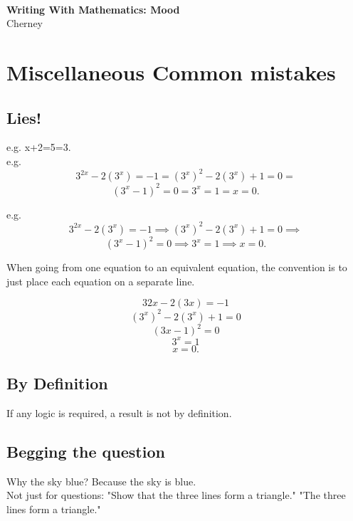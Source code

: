 \documentclass[12pt]{article}
\def\noi{\noindent}
\begin{document}
\thispagestyle{empty}
~
\vspace{-3.9cm}
\begin{center}
{
\Large
 {\bfseries  Writing With Mathematics: Mood}  \\[10mm]
 {  
 \vspace{-.9cm} 
Cherney}\\[1mm]
\vspace{3.5mm}
}

\end{center}





\section{Miscellaneous Common mistakes}

\subsection{Lies!}
e.g.  x+2=5=3.\\
e.g. 
\[3^{2x} -2(3^x) = -1 = (3^x)^2 -2(3^x) + 1 = 0 =\]
\[(3^x -1)^2 = 0 = 3^x = 1 = x = 0.\]

\noi e.g. 
\[3^{2x} -2(3^x) = -1\implies (3^x)^2 -2(3^x) + 1 = 0 \implies\]
\[(3^x -1)^2 = 0 \implies 3^x = 1 \implies x = 0.\]

\noi When going from one equation to an equivalent equation, the convention is to
just place each equation on a separate line.

\[32x -2(3x) = -1\]
\[(3^x)^2 -2(3^x) + 1 = 0\]
\[(3x -1)^2 = 0\]
\[3^x = 1\]
\[x = 0.\]

\subsection{By Definition}
If any logic is required, a result is not by definition. 

\subsection{Begging the question}
Why the sky blue? Because the sky is blue.\\
Not just for questions: "Show that the three lines form a triangle." "The three lines form a triangle."
\end{document}
